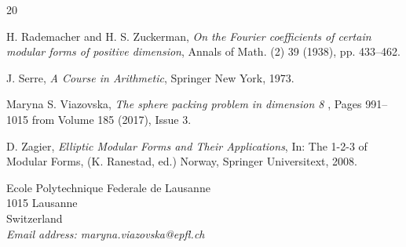 \begin{thebibliography}{20}

 {\sc H. Rademacher and H. S. Zuckerman}, {\em On the Fourier coefficients of certain modular forms of
positive dimension}, Annals of Math. (2) 39 (1938),  pp. 433--462.

 {\sc J. Serre}, {\em A Course in Arithmetic}, Springer New York, 1973.




 {\sc Maryna S. Viazovska}, {\em The sphere packing problem in dimension 8	},
Pages 991--1015 from Volume 185 (2017), Issue 3.

 {\sc D. Zagier}, {\em Elliptic Modular Forms and Their Applications}, In:  The 1-2-3 of Modular Forms, (K. Ranestad, ed.) Norway, Springer Universitext, 2008.

\end{thebibliography}

\newpage

{\footnotesize
\noindent
Ecole Polytechnique Federale de Lausanne\\
1015 Lausanne\\
Switzerland\\
{\it Email address: maryna.viazovska@epfl.ch}}
